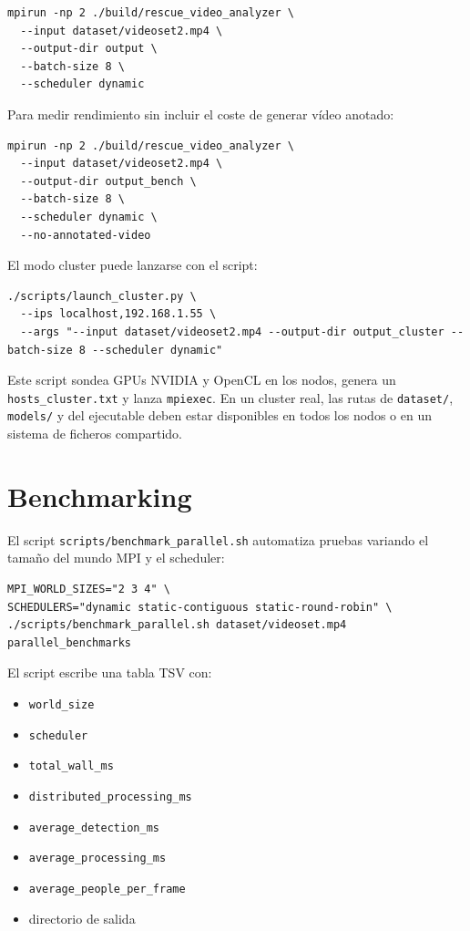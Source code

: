 \documentclass[12pt,a4paper]{article}
\begin{document}
\begin{lstlisting}[style=console]
mpirun -np 2 ./build/rescue_video_analyzer \
  --input dataset/videoset2.mp4 \
  --output-dir output \
  --batch-size 8 \
  --scheduler dynamic
\end{lstlisting}

Para medir rendimiento sin incluir el coste de generar v\'ideo anotado:

\begin{lstlisting}[style=console]
mpirun -np 2 ./build/rescue_video_analyzer \
  --input dataset/videoset2.mp4 \
  --output-dir output_bench \
  --batch-size 8 \
  --scheduler dynamic \
  --no-annotated-video
\end{lstlisting}

El modo cluster puede lanzarse con el script:

\begin{lstlisting}[style=console]
./scripts/launch_cluster.py \
  --ips localhost,192.168.1.55 \
  --args "--input dataset/videoset2.mp4 --output-dir output_cluster --batch-size 8 --scheduler dynamic"
\end{lstlisting}

Este script sondea GPUs NVIDIA y OpenCL en los nodos, genera un \texttt{hosts\_cluster.txt}
y lanza \texttt{mpiexec}. En un cluster real, las rutas de \texttt{dataset/}, \texttt{models/}
y del ejecutable deben estar disponibles en todos los nodos o en un sistema de ficheros
compartido.

\section{Benchmarking}

El script \texttt{scripts/benchmark\_parallel.sh} automatiza pruebas variando el tama\~no del
mundo MPI y el scheduler:

\begin{lstlisting}[style=console]
MPI_WORLD_SIZES="2 3 4" \
SCHEDULERS="dynamic static-contiguous static-round-robin" \
./scripts/benchmark_parallel.sh dataset/videoset.mp4 parallel_benchmarks
\end{lstlisting}

El script escribe una tabla TSV con:

\begin{itemize}
    \item \texttt{world\_size}
    \item \texttt{scheduler}
    \item \texttt{total\_wall\_ms}
    \item \texttt{distributed\_processing\_ms}
    \item \texttt{average\_detection\_ms}
    \item \texttt{average\_processing\_ms}
    \item \texttt{average\_people\_per\_frame}
    \item directorio de salida
\end{itemize}
\end{document}
